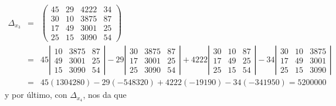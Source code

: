 \documentclass[12pt, landscape]{article}
\begin{document}
	\begin{eqnarray*}
		\Delta_{x_3} &=& \left(\begin{array}{rrrr}
							45 & 29 & 4222 & 34 \\
							30 & 10 & 3875 & 87 \\
							17 & 49 & 3001 & 25 \\
							25 & 15 & 3090 & 54
						\end{array}\right) \\
					&=&  45 \left|\begin{array}{rrr}
						10 & 3875 & 87 \\
						49 & 3001 & 25 \\
						15 & 3090 & 54
					\end{array}\right| 
					-29 \left|\begin{array}{rrr}
						30 & 3875 & 87 \\
						17 & 3001 & 25 \\
						25 & 3090 & 54
					\end{array}\right| 
					+4222 \left|\begin{array}{rrr}
						30 & 10 & 87 \\
						17 & 49 & 25 \\
						25 & 15 & 54
					\end{array}\right| 
					-34 \left|\begin{array}{rrr}
						30 & 10 & 3875 \\
						17 & 49 & 3001 \\
						25 & 15 & 3090
					\end{array}\right|  \\
					&=& 45(1304280) -29(-548320) +4222(-19190) -34(-341950) = 5200000
	\end{eqnarray*}
	y por \'ultimo, con $\Delta_{x_4}$, nos da que
\end{document}

